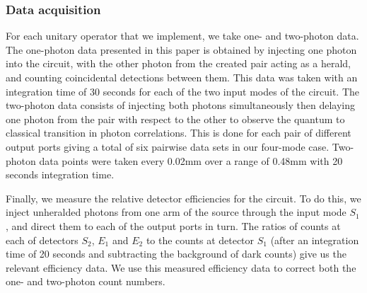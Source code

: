 \subsubsection{Data acquisition}
For each unitary operator that we implement, we take one- and two-photon data.
The one-photon data presented in this paper is obtained by injecting one photon
into the circuit, with the other photon from the created pair acting as a
herald, and counting coincidental detections between them. This data was taken
with an integration time of 30 seconds for each of the two input modes of the
circuit.
The two-photon data consists of injecting both photons simultaneously then
delaying one photon from the pair with respect to the other to observe the
quantum to classical transition in photon correlations. This is done for each
pair of different output ports giving a total of six pairwise data sets in our
four-mode case. Two-photon data points were taken every 0.02mm over a range of
0.48mm with 20 seconds integration time.

Finally, we measure the relative detector efficiencies for the circuit. To do
this, we inject unheralded photons from one arm of the source through the input
mode \(S_1\), and direct them to each of the output ports in turn. The ratios of
counts at each of detectors \(S_2\), \(E_1\) and \(E_2\) to the counts at
detector \(S_1\) (after an integration time of 20 seconds and subtracting the
background of dark counts) give us the relevant efficiency data. We use this
measured efficiency data to correct both the one- and two-photon count numbers.
